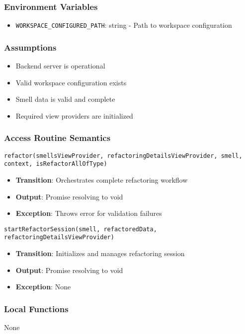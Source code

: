 \documentclass[12pt, titlepage]{article}
\begin{document}
\subsubsection{Environment Variables}
\begin{itemize}
\item \texttt{WORKSPACE\_CONFIGURED\_PATH}: string - Path to workspace configuration
\end{itemize}

\subsubsection{Assumptions}
\begin{itemize}
\item Backend server is operational
\item Valid workspace configuration exists
\item Smell data is valid and complete
\item Required view providers are initialized
\end{itemize}

\subsubsection{Access Routine Semantics}
\texttt{refactor(smellsViewProvider, refactoringDetailsViewProvider, smell, context, isRefactorAllOfType)}
\begin{itemize}
\item \textbf{Transition}: Orchestrates complete refactoring workflow
\item \textbf{Output}: Promise resolving to void
\item \textbf{Exception}: Throws error for validation failures
\end{itemize}

\texttt{startRefactorSession(smell, refactoredData, refactoringDetailsViewProvider)}
\begin{itemize}
\item \textbf{Transition}: Initializes and manages refactoring session
\item \textbf{Output}: Promise resolving to void
\item \textbf{Exception}: None
\end{itemize}

\subsubsection{Local Functions}
None
\end{document}
